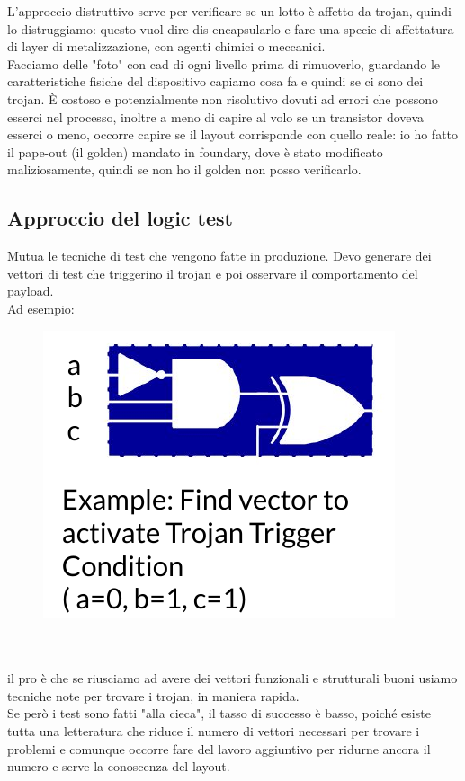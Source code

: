 \documentclass[oneside, 12pt]{extbook}
\begin{document}
L'approccio distruttivo serve per verificare se un lotto è affetto da trojan, quindi lo distruggiamo: questo vuol dire dis-encapsularlo e fare una specie di affettatura di layer di metalizzazione, con agenti chimici o meccanici.
\\Facciamo delle "foto" con cad di ogni livello prima di rimuoverlo, guardando le caratteristiche fisiche del dispositivo capiamo cosa fa e quindi se ci sono dei trojan. È costoso e potenzialmente non risolutivo dovuti ad errori che possono esserci nel processo, inoltre a meno di capire al volo se un transistor doveva esserci o meno, occorre capire se il layout corrisponde con quello reale: io ho fatto il pape-out (il golden) mandato in foundary, dove è stato modificato maliziosamente, quindi se non ho il golden non posso verificarlo.

\subsection{Approccio del logic test}
Mutua le tecniche di test che vengono fatte in produzione. Devo generare dei vettori di test che triggerino il trojan e poi osservare il comportamento del payload.
\\Ad esempio:\\
\begin{figure}[!h]
	\includegraphics[scale=0.4]{immagini/hardware/troj_activ.png}
\end{figure}
\\\\il pro è che se riusciamo ad avere dei vettori funzionali e strutturali buoni usiamo tecniche note per trovare i trojan, in maniera rapida.
\\Se però i test sono fatti "alla cieca", il tasso di successo è basso, poiché esiste tutta una letteratura che riduce il numero di vettori necessari per trovare i problemi e comunque occorre fare del lavoro aggiuntivo per ridurne ancora il numero e serve la conoscenza del layout.
\end{document}

